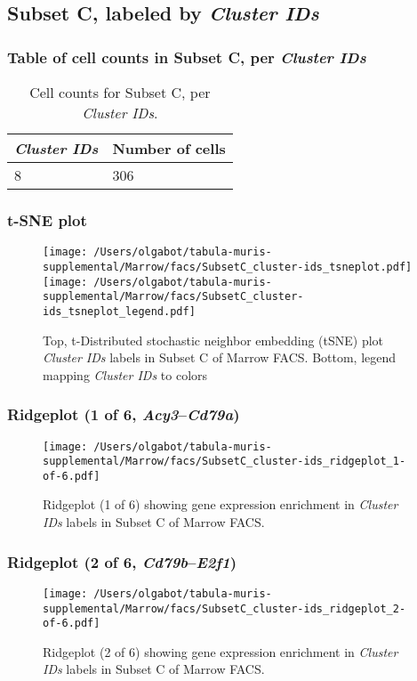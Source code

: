 \subsection{Subset C, labeled by \emph{Cluster IDs}}
\subsubsection{Table of cell counts in Subset C, per \emph{Cluster IDs}}\begin{table}[h]
\centering
\label{my-label}
\begin{tabular}{@{}ll@{}}
\toprule

\emph{Cluster IDs}& Number of cells \\ \midrule
8 & 306 \\
\bottomrule
\end{tabular}
\caption{Cell counts for Subset C, per \emph{Cluster IDs}.}
\end{table}

\clearpage
\subsubsection{t-SNE plot}
\begin{figure}[h]
\centering
\texttt{[image: /Users/olgabot/tabula-muris-supplemental/Marrow/facs/SubsetC\_cluster-ids\_tsneplot.pdf]}
\texttt{[image: /Users/olgabot/tabula-muris-supplemental/Marrow/facs/SubsetC\_cluster-ids\_tsneplot\_legend.pdf]}
\caption{Top, t-Distributed stochastic neighbor embedding (tSNE) plot  \emph{Cluster IDs} labels in Subset C of Marrow FACS. Bottom, legend mapping \emph{Cluster IDs} to colors}
\end{figure}


\clearpage

\subsubsection{Ridgeplot (1 of 6, \emph{Acy3}--\emph{Cd79a})}
\begin{figure}[h]
\centering
\texttt{[image: /Users/olgabot/tabula-muris-supplemental/Marrow/facs/SubsetC\_cluster-ids\_ridgeplot\_1-of-6.pdf]}

\caption{ Ridgeplot (1 of 6)  showing gene expression enrichment in \emph{Cluster IDs} labels in Subset C of Marrow FACS. }
\end{figure}


\clearpage

\subsubsection{Ridgeplot (2 of 6, \emph{Cd79b}--\emph{E2f1})}
\begin{figure}[h]
\centering
\texttt{[image: /Users/olgabot/tabula-muris-supplemental/Marrow/facs/SubsetC\_cluster-ids\_ridgeplot\_2-of-6.pdf]}

\caption{ Ridgeplot (2 of 6)  showing gene expression enrichment in \emph{Cluster IDs} labels in Subset C of Marrow FACS. }
\end{figure}


